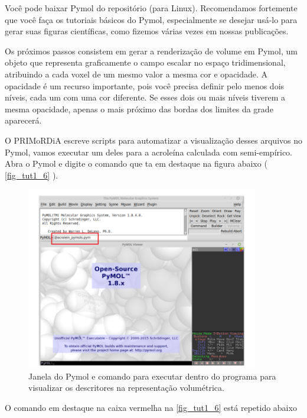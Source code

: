 \documentclass[a4paper,11pt]{refart}
\begin{document}
Você pode baixar Pymol do repositório (para Linux). Recomendamos fortemente que você faça os tutoriais básicos do Pymol, especialmente se desejar usá-lo para gerar suas figuras científicas, como fizemos várias vezes em nossas publicações. 

Os próximos passos consistem em gerar a renderização de volume em Pymol, um objeto que representa graficamente o campo escalar no espaço tridimensional, atribuindo a cada voxel de um mesmo valor a mesma cor e opacidade. A opacidade é um recurso importante, pois você precisa definir pelo menos dois níveis, cada um com uma cor diferente. Se esses dois ou mais níveis tiverem a mesma opacidade, apenas o mais próximo das bordas dos limites da grade aparecerá.

O PRIMoRDiA escreve scripts para automatizar a visualização desses arquivos no Pymol, vamos executar um deles para a acroleína calculada com semi-empírico. Abra o Pymol e digite o comando que ta em destaque na figura abaixo ( \autoref{fig_tut1_6} ). 

\hspace*{-\leftmarginwidth}
\begin{minipage}{\fullwidth}
\begin{figure}[H]
\begin{center}
\includegraphics[width=4in]{images/img7}
\caption{Janela do Pymol e comando para executar dentro do programa para visualizar os descritores na representação volumétrica.}
\label{fig_tut1_6}
\end{center}
\end{figure}
\end{minipage}

O comando em destaque na caixa vermelha na \autoref{fig_tut1_6} está repetido abaixo
\end{document}
